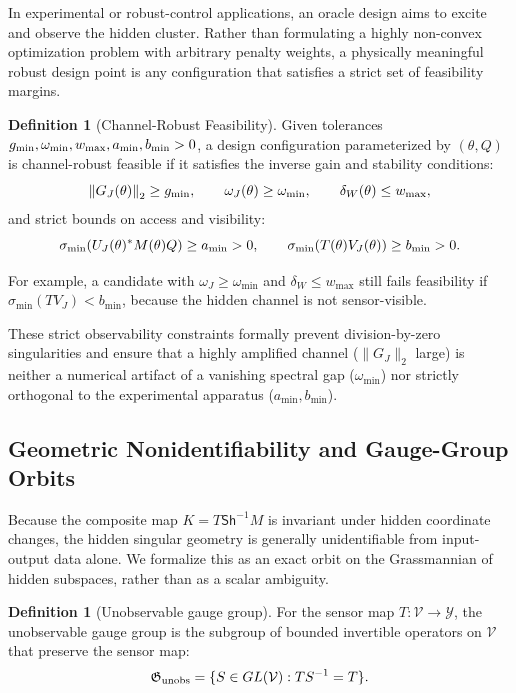 \documentclass[review]{siamart220329}
\theoremstyle{definition}
\newtheorem{definition}[theorem]{Definition}
\theoremstyle{remark}
\newcommand{\calY}{\mathcal{Y}}
\newcommand{\calV}{\mathcal{V}}
\newcommand{\Sh}{\mathsf{Sh}}
\newcommand{\smin}{\sigma_{\min}}
\newcommand{\norm}[1]{\left\lVert #1\right\rVert}
\begin{document}
In experimental or robust-control applications, an oracle design aims to excite and observe the hidden cluster. Rather than formulating a highly non-convex optimization problem with arbitrary penalty weights, a physically meaningful robust design point is any configuration that satisfies a strict set of feasibility margins.

\begin{definition}[Channel-Robust Feasibility]
\label{def:channel-robust-feasibility}
Given tolerances $g_{\rm min}, \omega_{\rm min}, w_{\rm max}, a_{\rm min}, b_{\rm min} > 0$, a design configuration parameterized by $(\theta, Q)$ is channel-robust feasible if it satisfies the inverse gain and stability conditions:
\begin{equation}
    \norm{G_J(\theta)}_2\geq g_{\rm min},\qquad
    \omega_J(\theta)\geq\omega_{\rm min},\qquad
    \delta_W(\theta)\leq w_{\rm max},
    \label{eq:channel-design-gain-access}
\end{equation}
and strict bounds on access and visibility:
\begin{equation}
    \smin(U_J(\theta)^*M(\theta)Q)\geq a_{\rm min}>0,
    \qquad
    \smin(T(\theta)V_J(\theta))\geq b_{\rm min}>0.
    \label{eq:channel-design-visibility-metric}
\end{equation}
\end{definition}
For example, a candidate with $\omega_J\ge\omega_{\min}$ and $\delta_W\le w_{\max}$ still fails feasibility if $\smin(TV_J)<b_{\min}$, because the hidden channel is not sensor-visible.

These strict observability constraints formally prevent division-by-zero singularities and ensure that a highly amplified channel ($\|G_J\|_2$ large) is neither a numerical artifact of a vanishing spectral gap ($\omega_{\min}$) nor strictly orthogonal to the experimental apparatus ($a_{\min}, b_{\min}$).


\subsection{Geometric Nonidentifiability and Gauge-Group Orbits}

Because the composite map $K=T\Sh^{-1}M$ is invariant under hidden coordinate changes, the hidden singular geometry is generally unidentifiable from input-output data alone. We formalize this as an exact orbit on the Grassmannian of hidden subspaces, rather than as a scalar ambiguity.

\begin{definition}[Unobservable gauge group]
For the sensor map $T:\calV\to\calY$, the unobservable gauge group is the subgroup of bounded invertible operators on $\calV$ that preserve the sensor map:
\begin{equation}
    \mathfrak G_{\rm unobs}=
    \{S\in GL(\calV): T S^{-1}=T\}.
\end{equation}
\end{definition}
\end{document}
